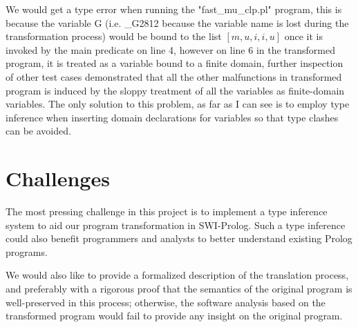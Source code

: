\documentclass[12pt]{article}
\begin{document}
We would get a type error when running the "fast\_mu\_clp.pl" program, this is because the variable G (i.e. \_G2812 because the variable name is lost during the transformation process) would be bound to the list $[m, u, i, i, u]$ once it is invoked by the main predicate on line 4, however on line 6 in the transformed program, it is treated as a variable bound to a finite domain,  further inspection of other test cases demonstrated that all the other malfunctions in transformed program is induced by the sloppy treatment of all the variables as finite-domain variables. The only solution to this problem, as far as I can see is to employ type inference when inserting domain declarations for variables so that type clashes can be avoided.

\section{Challenges}\label{challenges}
The most pressing challenge in this project is to implement a type inference system to aid our program transformation in SWI-Prolog. Such a type inference could also benefit programmers and analysts to better understand existing Prolog programs. 

We would also like to provide a formalized description of the translation process, and preferably with a rigorous proof that the semantics of the original program is well-preserved in this process; otherwise, the software analysis based on the transformed program would fail to provide any insight on the original program.



\end{document}
